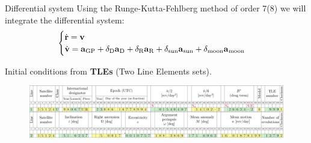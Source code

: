 \documentclass{beamer} %
\begin{document}
\begin{frame}{Differential system}
  Using the Runge-Kutta-Fehlberg method of order 7(8) we will integrate the differential system:
  \begin{equation*}
    \begin{cases}
      \dot{\boldsymbol{\mathrm{r}}}=\boldsymbol{\mathrm{v}} \\
      \dot{\boldsymbol{\mathrm{v}}}=\boldsymbol{\mathrm{a}}_{\mathrm{GP}} + \delta_{\mathrm{D}}\boldsymbol{\mathrm{a}}_{\mathrm{D}}+\delta_{\mathrm{R}}\boldsymbol{\mathrm{a}}_{\mathrm{R}}+\delta_{\mathrm{sun}}\boldsymbol{\mathrm{a}}_{\mathrm{sun}}+\delta_{\mathrm{moon}}\boldsymbol{\mathrm{a}}_\mathrm{moon}
    \end{cases}
  \end{equation*}
  \pause
  \vspace{0.25cm}

  Initial conditions from \textbf{TLEs} (Two Line Elements sets).
  \begin{figure}
    \centering
    \includegraphics[width=\textwidth]{../Images/TLE.pdf}
  \end{figure}
\end{frame}
\end{document}
